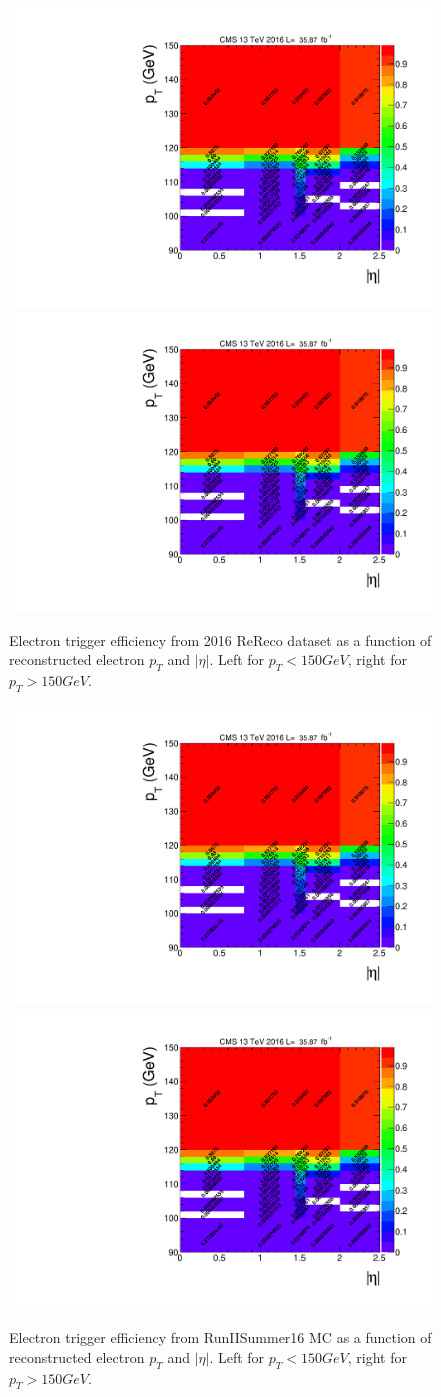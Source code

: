 \begin{figure}[htpb]
\begin{center}
\includegraphics[width=0.49\linewidth, page=1]{figures/hlt115electron_2016fulleff_absetapt.pdf}
\includegraphics[width=0.49\linewidth, page=2]{figures/hlt115electron_2016fulleff_absetapt.pdf}
\caption{Electron trigger efficiency from 2016 ReReco dataset as a function of reconstructed electron $p_T$ and $|\eta|$. Left for $p_T <150 GeV$, right for $p_T >150GeV$. }
\label{fig:trgeff_el_dt}
\end{center}
\end{figure}

\begin{figure}[htpb]
\begin{center}
\includegraphics[width=0.49\linewidth, page=3]{figures/hlt115electron_2016fulleff_absetapt.pdf}
\includegraphics[width=0.49\linewidth, page=4]{figures/hlt115electron_2016fulleff_absetapt.pdf}
\caption{Electron trigger efficiency from RunIISummer16 MC as a function of reconstructed electron $p_T$ and $|\eta|$. Left for $p_T <150 GeV$, right for $p_T >150GeV$. }
\label{fig:trgeff_el_mc}
\end{center}
\end{figure}

